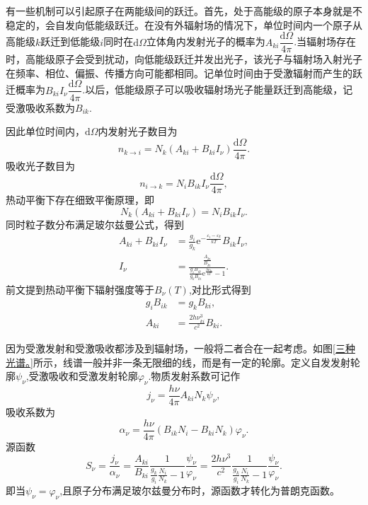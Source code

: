 \documentclass[../天体物理基础.tex]{subfiles}
\begin{document}
有一些机制可以引起原子在两能级间的跃迁。首先，处于高能级的原子本身就是不稳定的，会自发向低能级跃迁。在没有外辐射场的情况下，单位时间内一个原子从高能级$k$跃迁到低能级$i$同时在$\mathrm{d}\Omega$立体角内发射光子的概率为$A_{ki}\dfrac{\mathrm{d}\Omega}{4\pi}$.当辐射场存在时，高能级原子会受到扰动，向低能级跃迁并发出光子，该光子与辐射场入射光子在频率、相位、偏振、传播方向可能都相同。记单位时间由于受激辐射而产生的跃迁概率为$B_{ki}I_{\nu}\dfrac{\mathrm{d}\Omega}{4\pi}$.以后，低能级原子可以吸收辐射场光子能量跃迁到高能级，记受激吸收系数为$B_{ik}$.

因此单位时间内，$\mathrm{d}\Omega$内发射光子数目为
\begin{equation}
n_{k\to i}=N_k(A_{ki}+B_{ki}I_\nu)\frac{\mathrm{d}\Omega}{4\pi}.
\end{equation}
吸收光子数目为
\begin{equation}
n_{i\to k}=N_iB_{ik}I_\nu\frac{\mathrm{d}\Omega}{4\pi},
\end{equation}
热动平衡下存在细致平衡原理，即
\begin{equation}
N_k(A_{ki}+B_{ki}I_\nu)=N_iB_{ik}I_\nu.
\end{equation}
同时粒子数分布满足玻尔兹曼公式，得到
\begin{align}
A_{ki}+B_{ki}I_\nu&=\frac{g_i}{g_k}\mathrm{e}^{-\frac{\varepsilon_i-\varepsilon_k}{kT}}B_{ik}I_\nu,\\
I_\nu&=\frac{\frac{A_{ki}}{B_{ki}}}{\frac{g_iB_{ik}}{g_kB_{ki}}\mathrm{e}^\frac{h\nu_{ki}}{kT}-1}.
\end{align}
前文提到热动平衡下辐射强度等于$B_\nu(T)$,对比形式得到
\begin{align}
g_iB_{ik}&=g_kB_{ki},\\
A_{ki}&=\frac{2h\nu_{ki}^3}{c^2}B_{ki}.
\end{align}

因为受激发射和受激吸收都涉及到辐射场，一般将二者合在一起考虑。如图\ref{三种光谱。}所示，线谱一般并非一条无限细的线，而是有一定的轮廓。定义自发发射轮廓$\psi_\nu$,受激吸收和受激发射轮廓$\varphi_\nu$.物质发射系数可记作
\begin{equation}
j_\nu=\frac{h\nu}{4\pi}A_{ki}N_k\psi_\nu,
\end{equation}
吸收系数为
\begin{equation}
\alpha_{\nu}=\frac{h\nu}{4\pi}(B_{ik}N_i-B_{ki}N_{k})\varphi_\nu.\label{1.2.14}
\end{equation}
源函数
\begin{equation}
S_\nu=\frac{j_\nu}{\alpha_\nu}=\frac{A_{ki}}{B_{ki}}\frac{1}{\frac{g_k}{g_i}\frac{N_i}{N_k}-1}\frac{\psi_\nu}{\varphi
_\nu}=\frac{2h\nu^3}{c^2}\frac{1}{\frac{g_k}{g_i}\frac{N_i}{N_k}-1}\frac{\psi_\nu}{\varphi
_\nu}.
\end{equation}
即当$\psi_\nu=\varphi_\nu$,且原子分布满足玻尔兹曼分布时，源函数才转化为普朗克函数。
\end{document}
